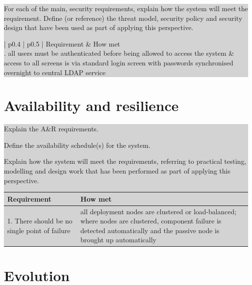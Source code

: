 \documentclass[a4paper,11pt]{report}
\newcommand{\instructions}[1]{
  \noindent\colorbox{lightgray}{%
    \parbox{\linewidth}{%
      #1
    }%
  }%
 \vspace{0.1cm}
}
\begin{document}
\instructions{
For each of the main, security requirements, explain how the system
will meet the requirement. Define (or reference) the threat model,
security policy and security design that have been used as part of
applying this perspective.

\begin{center}
  \begin{tabular}[h!]{| p{0.4\textwidth} | p{0.5\textwidth} |}
    \hline
    \rowcolor{gray}
    Requirement & How met \\
    \hline
    \hline
    1. all users must be authenticated before being allowed to access
    the system & access to all screens is via standard login screen
    with passwords synchronised overnight to central LDAP service\\

    \hline
 \end{tabular}
\end{center}

}


\section{Availability and resilience}
\label{sec:avail-resil}

\instructions{
Explain the A\&R requirements.

Define the availability schedule(s) for the system.

Explain how the system will meet the requirements, referring to
practical testing, modelling and design work that has been performed
as part of applying this perspective.

\begin{center}
  \begin{tabular}[h!]{| p{0.4\textwidth} | p{0.5\textwidth} |}
    \hline
    \rowcolor{gray}
    Requirement & How met \\
    \hline
    \hline
    1. There should be no single point of failure & all deployment
    nodes are clustered or load-balanced; where nodes are clustered,
    component failure is detected automatically and the passive node
    is brought up automatically\\

    \hline
 \end{tabular}
\end{center}

}


\section{Evolution}
\label{sec:evolution}
\end{document}
